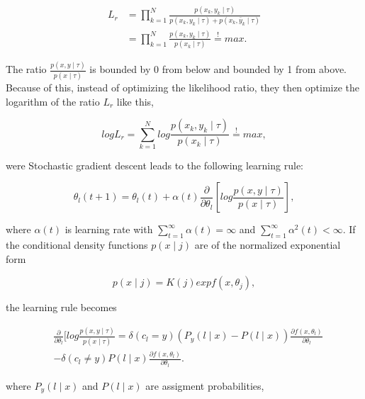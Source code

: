 \documentclass[12pt,oneside,a4paper,parskip]{scrbook}
\begin{document}
\begin{equation}
  \begin{split}
    L_r &= \displaystyle\prod_{k=1}^{N} \frac{p(x_k, y_k\mid\tau)}{p(x_k, y_k\mid\tau) + p(x_k, \bar{y}_k\mid\tau)} \\
        &= \displaystyle\prod_{k=1}^{N} \frac{p(x_k, y_k\mid\tau)}{p(x_k\mid\tau)}  \overset{!}{=} max.
  \end{split}
\end{equation}

The ratio $\frac{p(x, y\mid\tau)}{p(x\mid\tau)}$ is bounded by 0 from below and bounded by 1 from above. Because of this, 
instead of optimizing the likelihood ratio, they then optimize the 
logarithm of the ratio $L_r$ like this,

\begin{equation}
    log L_r = \displaystyle\sum_{k=1}^{N}log\frac{p(x_k, y_k\mid\tau)}{p(x_k\mid\tau)} \overset{!}{=} max,
\end{equation}

were Stochastic gradient descent leads to the following learning rule:

\begin{equation}
  \theta_l(t + 1) = \theta_l(t) + \alpha(t)\frac{\partial}{\partial\theta_l} [log \frac{p(x, y\mid\tau)}{p(x\mid\tau)}]
  \label{equ:RSLVQ_1},
\end{equation}

where $\alpha(t)$ is learning rate with $\sum_{t=1}^{\infty} \alpha(t) = \infty$ and $\sum_{t=1}^{\infty} \alpha^2(t) < \infty$.
If the conditional density functions $p(x\mid j)$ are of the normalized exponential form

\begin{equation}
  p(x\mid j) = K(j) exp f(x, \theta_j), 
\end{equation}

the learning rule becomes

\begin{equation}
  \begin{split}
    &\frac{\partial}{\partial\theta_l} [log \frac{p(x, y\mid\tau)}{p(x\mid\tau)} = \delta(c_l = y)(P_y(l\mid x) - P(l\mid x))\frac{\partial f(x, \theta_l) }{\partial\theta_l} \\
    &- \delta(c_l \neq y) P(l\mid x)\frac{\partial f(x, \theta_l) }{\partial\theta_l}.
  \end{split}
\end{equation}

where $P_y(l\mid x)$ and $P(l\mid x)$ are assigment probabilities,
\end{document}
